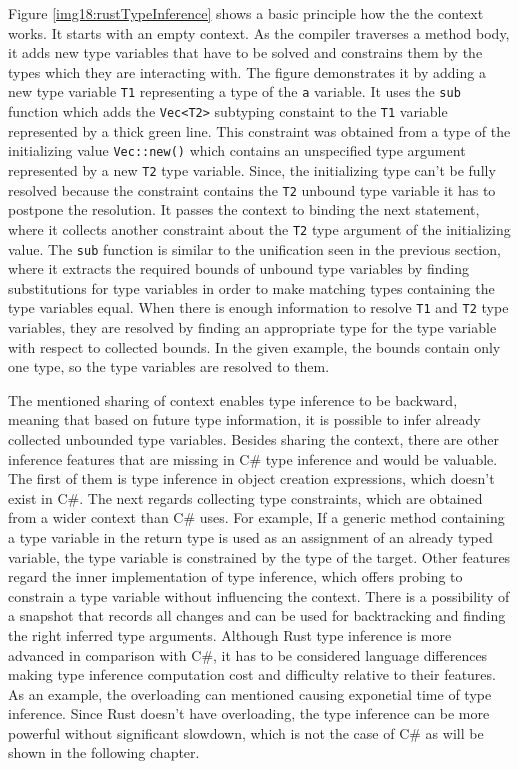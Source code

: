 Figure \ref{img18:rustTypeInference} shows a basic principle how the the context works. 
It starts with an empty context. 
As the compiler traverses a method body, it adds new type variables that have to be solved and constrains them by the types which they are interacting with. 
The figure demonstrates it by adding a new type variable \texttt{T1} representing a type of the \texttt{a} variable.
It uses the \texttt{sub} function which adds the \texttt{Vec<T2>} subtyping constaint to the \texttt{T1} variable represented by a thick green line.
This constraint was obtained from a type of the initializing value \texttt{Vec::new()} which contains an unspecified type argument represented by a new \texttt{T2} type variable.
Since, the initializing type can't be fully resolved because the constraint contains the \texttt{T2} unbound type variable it has to postpone the resolution. 
It passes the context to binding the next statement, where it collects another constraint about the \texttt{T2} type argument of the initializing value.
The \texttt{sub} function is similar to the unification seen in the previous section, where it extracts the required bounds of unbound type variables by finding substitutions for type variables in order to make matching types containing the type variables equal.
When there is enough information to resolve \texttt{T1} and \texttt{T2} type variables, they are resolved by finding an appropriate type for the type variable with respect to collected bounds.
In the given example, the bounds contain only one type, so the type variables are resolved to them.
\par
The mentioned sharing of context enables type inference to be backward, meaning that based on future type information, it is possible to infer already collected unbounded type variables. 
Besides sharing the context, there are other inference features that are missing in C\# type inference and would be valuable. 
The first of them is type inference in object creation expressions, which doesn't exist in C\#. 
The next regards collecting type constraints, which are obtained from a wider context than C\# uses. 
For example, If a generic method containing a type variable in the return type is used as an assignment of an already typed variable, the type variable is constrained by the type of the target. Other features regard the inner implementation of type inference, which offers probing to constrain a type variable without influencing the context. 
There is a possibility of a snapshot that records all changes and can be used for backtracking and finding the right inferred type arguments.
Although Rust type inference is more advanced in comparison with C\#, it has to be considered language differences making type inference computation cost and difficulty relative to their features. 
As an example, the overloading can mentioned causing exponetial time of type inference. 
Since Rust doesn't have overloading, the type inference can be more powerful without significant slowdown, which is not the case of C\# as will be shown in the following chapter.

